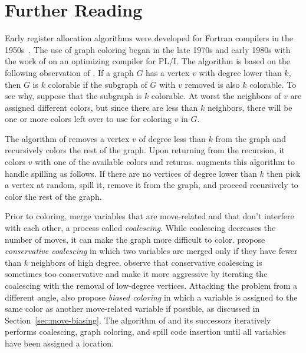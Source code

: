 \documentclass[7x10,nocrop]{TimesAPriori_MIT}%
\begin{document}


\section{Further Reading}
\label{sec:register-allocation-further-reading}

Early register allocation algorithms were developed for Fortran
compilers in the 1950s~\citep{Horwitz:1966aa,Backus:1978aa}.  The use
of graph coloring began in the late 1970s and early 1980s with the
work of \citet{Chaitin:1981vl} on an optimizing compiler for PL/I. The
algorithm is based on the following observation of
\citet{Kempe:1879aa}. If a graph $G$ has a vertex $v$ with degree
lower than $k$, then $G$ is $k$ colorable if the subgraph of $G$ with
$v$ removed is also $k$ colorable. To see why, suppose that the
subgraph is $k$ colorable.  At worst the neighbors of $v$ are assigned
different colors, but since there are less than $k$ neighbors, there
will be one or more colors left over to use for coloring $v$ in $G$.

The algorithm of \citet{Chaitin:1981vl} removes a vertex $v$ of degree
less than $k$ from the graph and recursively colors the rest of the
graph. Upon returning from the recursion, it colors $v$ with one of
the available colors and returns.  \citet{Chaitin:1982vn} augments
this algorithm to handle spilling as follows. If there are no vertices
of degree lower than $k$ then pick a vertex at random, spill it,
remove it from the graph, and proceed recursively to color the rest of
the graph.

Prior to coloring, \citet{Chaitin:1981vl} merge variables that are
move-related and that don't interfere with each other, a process
called \emph{coalescing}. While coalescing decreases the number of
moves, it can make the graph more difficult to
color. \citet{Briggs:1994kx} propose \emph{conservative coalescing} in
which two variables are merged only if they have fewer than $k$
neighbors of high degree. \citet{George:1996aa} observe that
conservative coalescing is sometimes too conservative and make it more
aggressive by iterating the coalescing with the removal of low-degree
vertices.
%
Attacking the problem from a different angle, \citet{Briggs:1994kx}
also propose \emph{biased coloring} in which a variable is assigned to
the same color as another move-related variable if possible, as
discussed in Section~\ref{sec:move-biasing}.
%
The algorithm of \citet{Chaitin:1981vl} and its successors iteratively
performs coalescing, graph coloring, and spill code insertion until
all variables have been assigned a location.
\end{document}
